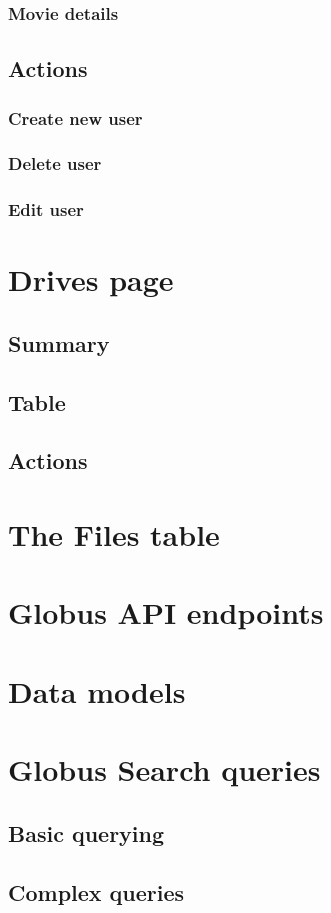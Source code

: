\documentclass{report}
\begin{document}
\subsection{Movie details}
\section{Actions}
\subsection{Create new user}
\subsection{Delete user}
\subsection{Edit user}

\chapter{Drives page}
\section{Summary}
\section{Table}
\section{Actions}

\appendix

\chapter{The Files table}

\chapter{Globus API endpoints\label{appendix:globusapis}}


\chapter{Data models}


\chapter{Globus Search queries}
\section{Basic querying}
\section{Complex queries}
\end{document}
